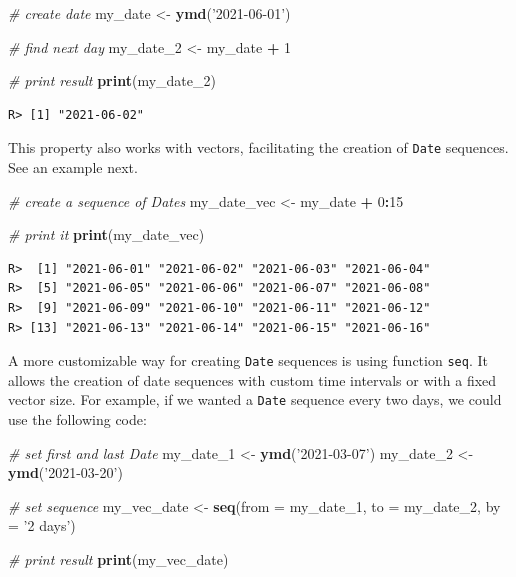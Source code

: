 \documentclass[
  12pt,
]{book}
\newenvironment{Shaded}{\begin{snugshade}}{\end{snugshade}}
\newcommand{\CommentTok}[1]{\textcolor[rgb]{0.37,0.37,0.37}{\textit{#1}}}
\newcommand{\DataTypeTok}[1]{\textcolor[rgb]{0.27,0.27,0.27}{#1}}
\newcommand{\DecValTok}[1]{\textcolor[rgb]{0.06,0.06,0.06}{#1}}
\newcommand{\KeywordTok}[1]{\textcolor[rgb]{0.27,0.27,0.27}{\textbf{#1}}}
\newcommand{\NormalTok}[1]{#1}
\newcommand{\OperatorTok}[1]{\textcolor[rgb]{0.43,0.43,0.43}{\textbf{#1}}}
\newcommand{\StringTok}[1]{\textcolor[rgb]{0.5,0.5,0.5}{#1}}
\begin{document}
\begin{Shaded}
\begin{Highlighting}[]
\CommentTok{# create date}
\NormalTok{my_date <-}\StringTok{ }\KeywordTok{ymd}\NormalTok{(}\StringTok{'2021-06-01'}\NormalTok{)}

\CommentTok{# find next day}
\NormalTok{my_date_}\DecValTok{2}\NormalTok{ <-}\StringTok{ }\NormalTok{my_date }\OperatorTok{+}\StringTok{ }\DecValTok{1}

\CommentTok{# print result}
\KeywordTok{print}\NormalTok{(my_date_}\DecValTok{2}\NormalTok{)}
\end{Highlighting}
\end{Shaded}

\begin{verbatim}
R> [1] "2021-06-02"
\end{verbatim}

This property also works with vectors, facilitating the creation of \texttt{Date} sequences. See an example next.

\begin{Shaded}
\begin{Highlighting}[]
\CommentTok{# create a sequence of Dates}
\NormalTok{my_date_vec <-}\StringTok{ }\NormalTok{my_date }\OperatorTok{+}\StringTok{ }\DecValTok{0}\OperatorTok{:}\DecValTok{15}

\CommentTok{# print it}
\KeywordTok{print}\NormalTok{(my_date_vec)}
\end{Highlighting}
\end{Shaded}

\begin{verbatim}
R>  [1] "2021-06-01" "2021-06-02" "2021-06-03" "2021-06-04"
R>  [5] "2021-06-05" "2021-06-06" "2021-06-07" "2021-06-08"
R>  [9] "2021-06-09" "2021-06-10" "2021-06-11" "2021-06-12"
R> [13] "2021-06-13" "2021-06-14" "2021-06-15" "2021-06-16"
\end{verbatim}

A more customizable way for creating \texttt{Date} sequences is using function \texttt{seq}. It allows the creation of date sequences with custom time intervals or with a fixed vector size. For example, if we wanted a \texttt{Date} sequence every two days, we could use the following code: 

\begin{Shaded}
\begin{Highlighting}[]
\CommentTok{# set first and last Date}
\NormalTok{my_date_}\DecValTok{1}\NormalTok{ <-}\StringTok{ }\KeywordTok{ymd}\NormalTok{(}\StringTok{'2021-03-07'}\NormalTok{)}
\NormalTok{my_date_}\DecValTok{2}\NormalTok{ <-}\StringTok{ }\KeywordTok{ymd}\NormalTok{(}\StringTok{'2021-03-20'}\NormalTok{)}

\CommentTok{# set sequence}
\NormalTok{my_vec_date <-}\StringTok{ }\KeywordTok{seq}\NormalTok{(}\DataTypeTok{from =}\NormalTok{ my_date_}\DecValTok{1}\NormalTok{,}
                   \DataTypeTok{to =}\NormalTok{ my_date_}\DecValTok{2}\NormalTok{,}
                   \DataTypeTok{by =} \StringTok{'2 days'}\NormalTok{)}

\CommentTok{# print result}
\KeywordTok{print}\NormalTok{(my_vec_date)}
\end{Highlighting}
\end{Shaded}
\end{document}
